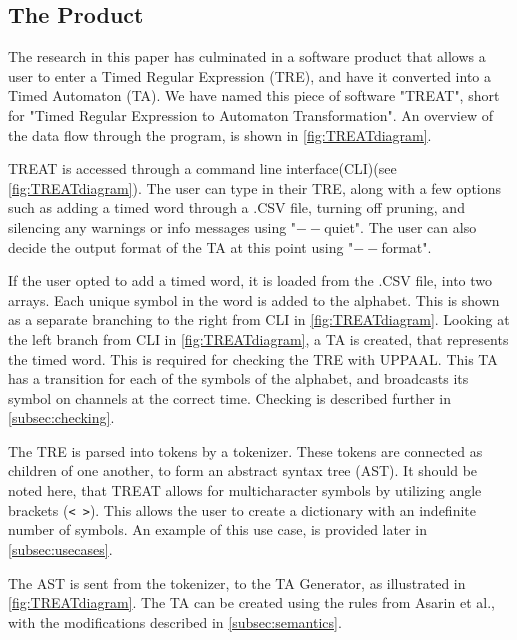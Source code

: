 \subsection{The Product}\label{subsec:theProduct}
The research in this paper has culminated in a software product that allows a user to enter a Timed Regular Expression (TRE), and have it converted into a Timed Automaton (TA).
We have named this piece of software "TREAT", short for "Timed Regular Expression to Automaton Transformation".
An overview of the data flow through the program, is shown in \cref{fig:TREATdiagram}.

\begin{center}
    
\end{center}

TREAT is accessed through a command line interface(CLI)(see \cref{fig:TREATdiagram}). The user can type in their TRE, along with a few options such as adding a timed word through a .CSV file, turning off pruning, and silencing any warnings or info messages using "$--$quiet".
The user can also decide the output format of the TA at this point using "$--$format".

If the user opted to add a timed word, it is loaded from the .CSV file, into two arrays. Each unique symbol in the word is added to the alphabet. This is shown as a separate branching to the right from CLI in \cref{fig:TREATdiagram}.
Looking at the left branch from CLI in \cref{fig:TREATdiagram}, a TA is created, that represents the timed word. This is required for checking the TRE with UPPAAL. This TA has a transition for each of the symbols of the alphabet, and broadcasts its symbol on channels at the correct time. Checking is described further in \cref{subsec:checking}.

The TRE is parsed into tokens by a tokenizer. These tokens are connected as children of one another, to form an abstract syntax tree (AST).
It should be noted here, that TREAT allows for multicharacter symbols by utilizing angle brackets (\verb|< >|). This allows the user to create a dictionary with an indefinite number of symbols. An example of this use case, is provided later in \cref{subsec:usecases}.

The AST is sent from the tokenizer, to the TA Generator, as illustrated in \cref{fig:TREATdiagram}. The TA can be created using the rules from Asarin et al., with the modifications described in \cref{subsec:semantics}.

